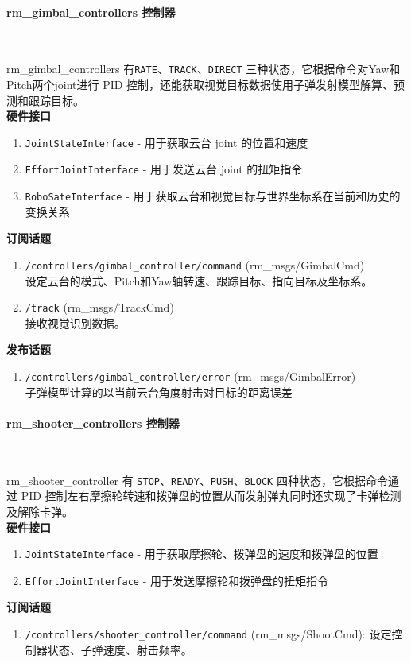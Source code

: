 \paragraph{rm\_gimbal\_controllers 控制器}~{}
\par
rm\_gimbal\_controllers 有\lstinline{RATE}、\lstinline{TRACK}、\lstinline{DIRECT} 三种状态，它根据命令对Yaw和Pitch两个joint进行 PID 控制，还能获取视觉目标数据使用子弹发射模型解算、预测和跟踪目标。\\
\textbf{硬件接口}
\begin{enumerate}
    \item \lstinline{JointStateInterface} - 用于获取云台 joint 的位置和速度
    \item \lstinline{EffortJointInterface} - 用于发送云台 joint 的扭矩指令
    \item \lstinline{RoboSateInterface} - 用于获取云台和视觉目标与世界坐标系在当前和历史的变换关系
\end{enumerate}
\textbf{订阅话题}
\begin{enumerate}
    \item \lstinline{/controllers/gimbal_controller/command} (rm\_msgs/GimbalCmd)\\
    设定云台的模式、Pitch和Yaw轴转速、跟踪目标、指向目标及坐标系。
    \item \lstinline{/track} (rm\_msgs/TrackCmd)\\
    接收视觉识别数据。
\end{enumerate}
\textbf{发布话题}
\begin{enumerate}
    \item  \lstinline{/controllers/gimbal_controller/error} (rm\_msgs/GimbalError)\\
    子弹模型计算的以当前云台角度射击对目标的距离误差
\end{enumerate}

\paragraph{rm\_shooter\_controllers 控制器}~{}
\par
rm\_shooter\_controller 有 \lstinline{STOP}、\lstinline{READY}、\lstinline{PUSH}、\lstinline{BLOCK} 四种状态，它根据命令通过 PID 控制左右摩擦轮转速和拨弹盘的位置从而发射弹丸同时还实现了卡弹检测及解除卡弹。\\
\textbf{硬件接口}
\begin{enumerate}
    \item \lstinline{JointStateInterface} - 用于获取摩擦轮、拨弹盘的速度和拨弹盘的位置
    \item \lstinline{EffortJointInterface} - 用于发送摩擦轮和拨弹盘的扭矩指令\end{enumerate}
\textbf{订阅话题}
\begin{enumerate}
    \item \lstinline{/controllers/shooter_controller/command} (rm\_msgs/ShootCmd):
    设定控制器状态、子弹速度、射击频率。
\end{enumerate}

